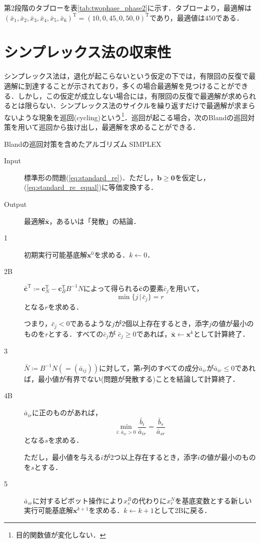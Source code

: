 \documentclass{jsreport}
\begin{document}
第2段階のタブローを表\ref{tab:twophase_phase2}に示す．タブローより，最適解は
$(\bar{x}_1, \bar{x}_2, \bar{x}_3, \bar{x}_4, \bar{x}_5, \bar{x}_6)^{\mathrm{T}}
= (10, 0, 45, 0, 50, 0)^{\mathrm{T}}$であり，最適値は$450$である．

\section{シンプレックス法の収束性}
シンプレックス法は，退化が起こらないという仮定の下では，有限回の反復で最適解に到達することが示されており，多くの場合最適解を見つけることができる．しかし，この仮定が成立しない場合には，有限回の反復で最適解が求められるとは限らない．シンプレックス法のサイクルを繰り返すだけで最適解が求まらないような現象を巡回(cycling)という\footnote{目的関数値が変化しない．}．巡回が起こる場合，次のBlandの巡回対策を用いて巡回から抜け出し，最適解を求めることができる．

\begin{itembox}[l]{Blandの巡回対策を含めたアルゴリズム SIMPLEX}
  \begin{description}
    \item[Input] 標準形の問題(\ref{eq:standard_re})．ただし，$\bm{b} \geq \bm{0}$を仮定し，(\ref{eq:standard_re_equal})に等価変換する．
    \item[Output] 最適解$\bar{\bm{x}}$，あるいは「発散」の結論．
  \end{description}
  \begin{description}
    \item[1] 初期実行可能基底解$\bm{x}^{0}$を求める．$k \leftarrow 0$．
    \item[2B] $\bar{\bm{c}}^{\mathrm{T}} \coloneqq \bm{c}_N^{\mathrm{T}} - \bm{c}_B^{\mathrm{T}}B^{-1}N$によって得られる$\bar{\bm{c}}$の要素$\bar{c}_j$を用いて，
    \begin{equation}
      \min \{j \, | \, \bar{c}_j\} = r \nonumber
    \end{equation}
    となる$r$を求める．

    つまり，$\bar{c}_j < 0$であるような$j$が2個以上存在するとき，添字$j$の値が最小のものを$r$とする．すべての$\bar{c}_j$が
    $\bar{c}_j \geq 0$であれば，$\bar{\bm{x}} \leftarrow \bm{x}^k$として計算終了．
    \item[3] $\bar{N} \coloneqq B^{-1}N (=(\bar{a}_{ij}))$に対して，第$r$列のすべての成分$\bar{a}_{ir}$が$\bar{a}_{ir} \leq 0$であれば，最小値が有界でない(問題が発散する)ことを結論して計算終了．
    \item[4B] $\bar{a}_{ir}$に正のものがあれば，
    \begin{equation}
      \min_{i: \, \bar{a}_{ir} > 0} \frac{\bar{b}_i}{\bar{a}_{ir}} = \frac{\bar{b}_s}{\bar{a}_{sr}} \nonumber
    \end{equation}
    となる$s$を求める．

    ただし，最小値を与える$i$が2つ以上存在するとき，添字$i$の値が最小のものを$s$とする．
    \item[5] $\bar{a}_{sr}$に対するピボット操作により$x_s^B$の代わりに$x_r^N$を基底変数とする新しい実行可能基底解$\bm{x}^{k + 1}$を求める．$k \leftarrow k + 1$として2Bに戻る．
  \end{description}
\end{itembox}
\end{document}
